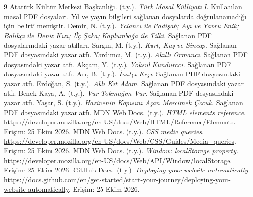 \documentclass[12pt,a4paper]{article}
\begin{document}
\begin{thebibliography}{9}
 Atatürk Kültür Merkezi Başkanlığı. (t.y.). \emph{Türk Masal Külliyatı I}. Kullanılan masal PDF dosyaları. Yıl ve yayın bilgileri sağlanan dosyalarda doğrulanamadığı için belirtilmemiştir.
 Demir, N. (t.y.). \emph{Yalancı ile Padişah; Ayı ve Yavru Enik; Balıkçı ile Deniz Kızı; Üç Şaka; Kaplumbağa ile Tilki}. Sağlanan PDF dosyalarındaki yazar atıfları.
 Sargın, M. (t.y.). \emph{Kurt, Kuş ve Sincap}. Sağlanan PDF dosyasındaki yazar atfı.
 Yardımcı, M. (t.y.). \emph{Akıllı Ormancı}. Sağlanan PDF dosyasındaki yazar atfı.
 Akçam, Y. (t.y.). \emph{Yoksul Kunduracı}. Sağlanan PDF dosyasındaki yazar atfı.
 Arı, B. (t.y.). \emph{İnatçı Keçi}. Sağlanan PDF dosyasındaki yazar atfı.
 Erdoğan, S. (t.y.). \emph{Aklı Kıt Adam}. Sağlanan PDF dosyasındaki yazar atfı.
 Benek Kaya, A. (t.y.). \emph{Vur Tokmağım Vur}. Sağlanan PDF dosyasındaki yazar atfı.
 Yaşar, S. (t.y.). \emph{Hazinenin Kapısını Açan Mercimek Çocuk}. Sağlanan PDF dosyasındaki yazar atfı.
 MDN Web Docs. (t.y.). \emph{HTML elements reference}. \url{https://developer.mozilla.org/en-US/docs/Web/HTML/Reference/Elements}. Erişim: 25 Ekim 2026.
 MDN Web Docs. (t.y.). \emph{CSS media queries}. \url{https://developer.mozilla.org/en-US/docs/Web/CSS/Guides/Media_queries}. Erişim: 25 Ekim 2026.
 MDN Web Docs. (t.y.). \emph{Window: localStorage property}. \url{https://developer.mozilla.org/en-US/docs/Web/API/Window/localStorage}. Erişim: 25 Ekim 2026.
 GitHub Docs. (t.y.). \emph{Deploying your website automatically}. \url{https://docs.github.com/en/get-started/start-your-journey/deploying-your-website-automatically}. Erişim: 25 Ekim 2026.
\end{thebibliography}

\appendix
\end{document}
